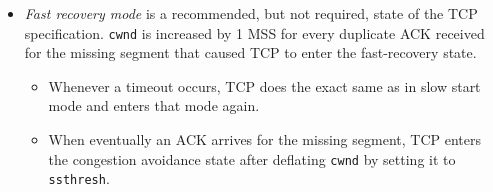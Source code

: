 \documentclass[8pt, table, xcdraw]{article}%
\begin{document}
\begin{itemize}
\begin{itemize}
        \item \emph{Fast recovery mode} is a recommended, but not required, state of the TCP specification. \lstinline{cwnd} is increased by 1 MSS for every duplicate ACK received for the missing segment that caused TCP to enter the fast-recovery state.
        \begin{itemize}
            \item Whenever a timeout occurs, TCP does the exact same as in slow start mode and enters that mode again.
            \item When eventually an ACK arrives for the missing segment, TCP enters the congestion avoidance state after deflating \lstinline{cwnd} by setting it to \lstinline{ssthresh}.
        \end{itemize}
    \end{itemize}


\end{itemize}
\end{document}
